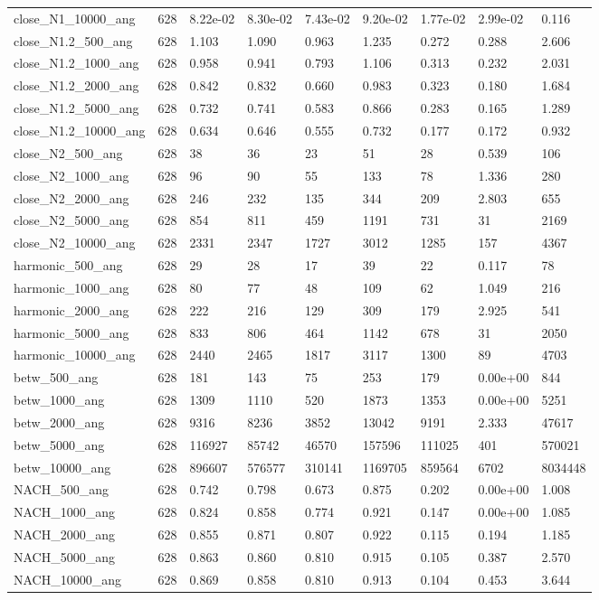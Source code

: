 \begin{tabular}{lrlllllll}
close\_N1\_10000\_ang & 628 & 8.22e-02 & 8.30e-02 & 7.43e-02 & 9.20e-02 & 1.77e-02 & 2.99e-02 & 0.116 \\
close\_N1.2\_500\_ang & 628 & 1.103 & 1.090 & 0.963 & 1.235 & 0.272 & 0.288 & 2.606 \\
close\_N1.2\_1000\_ang & 628 & 0.958 & 0.941 & 0.793 & 1.106 & 0.313 & 0.232 & 2.031 \\
close\_N1.2\_2000\_ang & 628 & 0.842 & 0.832 & 0.660 & 0.983 & 0.323 & 0.180 & 1.684 \\
close\_N1.2\_5000\_ang & 628 & 0.732 & 0.741 & 0.583 & 0.866 & 0.283 & 0.165 & 1.289 \\
close\_N1.2\_10000\_ang & 628 & 0.634 & 0.646 & 0.555 & 0.732 & 0.177 & 0.172 & 0.932 \\
close\_N2\_500\_ang & 628 & 38 & 36 & 23 & 51 & 28 & 0.539 & 106 \\
close\_N2\_1000\_ang & 628 & 96 & 90 & 55 & 133 & 78 & 1.336 & 280 \\
close\_N2\_2000\_ang & 628 & 246 & 232 & 135 & 344 & 209 & 2.803 & 655 \\
close\_N2\_5000\_ang & 628 & 854 & 811 & 459 & 1191 & 731 & 31 & 2169 \\
close\_N2\_10000\_ang & 628 & 2331 & 2347 & 1727 & 3012 & 1285 & 157 & 4367 \\
harmonic\_500\_ang & 628 & 29 & 28 & 17 & 39 & 22 & 0.117 & 78 \\
harmonic\_1000\_ang & 628 & 80 & 77 & 48 & 109 & 62 & 1.049 & 216 \\
harmonic\_2000\_ang & 628 & 222 & 216 & 129 & 309 & 179 & 2.925 & 541 \\
harmonic\_5000\_ang & 628 & 833 & 806 & 464 & 1142 & 678 & 31 & 2050 \\
harmonic\_10000\_ang & 628 & 2440 & 2465 & 1817 & 3117 & 1300 & 89 & 4703 \\
betw\_500\_ang & 628 & 181 & 143 & 75 & 253 & 179 & 0.00e+00 & 844 \\
betw\_1000\_ang & 628 & 1309 & 1110 & 520 & 1873 & 1353 & 0.00e+00 & 5251 \\
betw\_2000\_ang & 628 & 9316 & 8236 & 3852 & 13042 & 9191 & 2.333 & 47617 \\
betw\_5000\_ang & 628 & 116927 & 85742 & 46570 & 157596 & 111025 & 401 & 570021 \\
betw\_10000\_ang & 628 & 896607 & 576577 & 310141 & 1169705 & 859564 & 6702 & 8034448 \\
NACH\_500\_ang & 628 & 0.742 & 0.798 & 0.673 & 0.875 & 0.202 & 0.00e+00 & 1.008 \\
NACH\_1000\_ang & 628 & 0.824 & 0.858 & 0.774 & 0.921 & 0.147 & 0.00e+00 & 1.085 \\
NACH\_2000\_ang & 628 & 0.855 & 0.871 & 0.807 & 0.922 & 0.115 & 0.194 & 1.185 \\
NACH\_5000\_ang & 628 & 0.863 & 0.860 & 0.810 & 0.915 & 0.105 & 0.387 & 2.570 \\
NACH\_10000\_ang & 628 & 0.869 & 0.858 & 0.810 & 0.913 & 0.104 & 0.453 & 3.644 \\
\bottomrule
\end{tabular}
